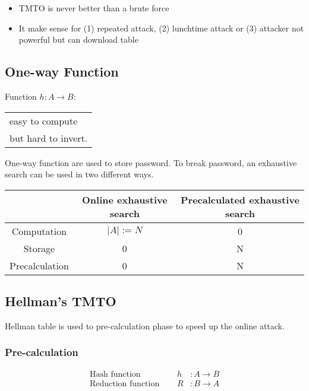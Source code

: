 
\begin{itemize}
    \item TMTO is never better than a brute force
    \item It make sense for (1) repeated attack, (2) lunchtime attack or
        (3) attacker not powerful but can download
        table
        \end{itemize}

\subsection{One-way Function} 

\begin{center}
    Function $h: A \rightarrow B$: 
    \begin{tabular}{l}
        easy to compute \\
        but hard to invert.
    \end{tabular}
\end{center}

One-way function are used to store password. To break password, an exhaustive
search can be used in two different ways.
\begin{table}[ht!]
    \centering
    \begin{tabular}{|c|c|c|}
        \hline
        & Online exhaustive search & Precalculated exhaustive search \\
        \hline
        Computation & $ |A|:=N $ & 0 \\
        Storage & 0 & N \\
        Precalculation & 0 & N \\
        \hline
    \end{tabular}
\end{table}

\subsection{Hellman's TMTO}
Hellman table is used to pre-calculation phase to speed up the online attack.

\subsubsection{Pre-calculation}

\begin{eqnarray*}
    \textrm{Hash function } \quad & h &: A \to B \\
    \textrm{Reduction function } \quad & R &: B \to A 
\end{eqnarray*}

